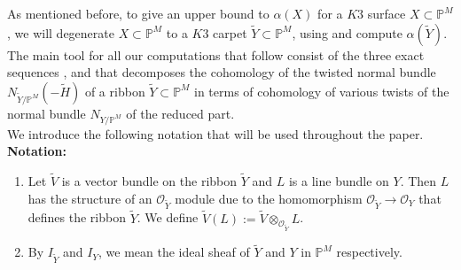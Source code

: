 \documentclass[11pt,twoside]{amsart}
\theoremstyle{plain}
\numberwithin{equation}{section}
\newtheorem{theorem}{Theorem}[section]
\theoremstyle{definition}
\begin{document}
As mentioned before, to give an upper bound to $\alpha(X)$ for a $K3$ surface $X \subset \mathbb{P}^M$, we will degenerate $X \subset \mathbb{P}^M$ to a $K3$ carpet $\widetilde{Y} \subset \mathbb{P}^M$, using  and compute $\alpha(\widetilde{Y})$.  The main tool for all our computations that follow consist of the three exact sequences ,  and   that decomposes the cohomology of the twisted normal bundle $N_{\widetilde{Y}/\mathbb{P}^M}(-\widetilde{H})$ of a ribbon $\widetilde{Y} \subset \mathbb{P}^M$ in terms of cohomology of various twists of the normal bundle $N_{Y/\mathbb{P}^M}$ of the reduced part. \\
\color{black}
\noindent We introduce the following notation that will be used throughout the paper. \\
\noindent \textbf{Notation:} 
\begin{enumerate} 
    \item[(a)]  Let $\widetilde{V}$ is a vector bundle on the ribbon $\widetilde{Y}$ and $L$ is a line bundle on $Y$. Then $L$ has the structure of an $\mathcal{O}_{\widetilde{Y}}$ module due to the homomorphism $\mathcal{O}_{\widetilde{Y}} \to \mathcal{O}_Y$ that defines the ribbon $\widetilde{Y}$.  We define $\widetilde{V}(L):=\widetilde{V}\otimes_{\mathcal{O}_{\widetilde{Y}}} L$.

    \item[(b)] By $I_{\widetilde{Y}}$ and $I_{Y}$, we mean the ideal sheaf of $\widetilde{Y}$ and $Y$ in $\mathbb{P}^M$ respectively.
\end{enumerate}

\color{black}



\end{document}
